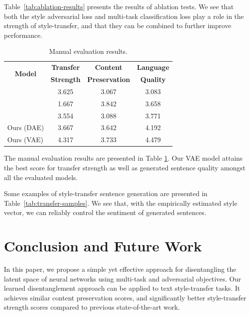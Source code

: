 \documentclass[letterpaper]{article} %
\newcommand{\tabh}[1]{\multicolumn{1}{c|}{\textbf{#1}}}
\newcommand{\tabc}[2]{\multicolumn{1}{|c||}{\multirow{#1}{*}{\textbf{#2}}}}
\begin{document}
Table~\ref{tab:ablation-results} presents the results of ablation tests.
We see that both the style adversarial loss and multi-task classification loss play a role in the strength of style-transfer, and that they can be combined to further improve performance.

\begin{table}[ht]
	\centering
	\begin{tabular}{| l || c | c | c | }
		\hline
		\tabc{2}{Model}                    & \tabh{Transfer} & \tabh{Content}      & \tabh{Language} \\
		                                   & \tabh{Strength} & \tabh{Preservation} & \tabh{Quality}  \\
		\hline
		\hline
		\citeauthor{shen2017style}         & 3.625           & 3.067               & 3.083           \\
		\hline
		\citeauthor{fu2017style}           & 1.667           & 3.842               & 3.658           \\
		\hline
		\citeauthor{zhao2018adversarially} & 3.554           & 3.088               & 3.771           \\
		\hline
		Ours (DAE)                         & 3.667           & 3.642               & 4.192           \\
		\hline
		Ours (VAE)                         & 4.317           & 3.733               & 4.479           \\
		\hline
	\end{tabular}
	\caption{Manual evaluation results.}
	\label{tab:manual-evaluation}
\end{table}

The manual evaluation results are presented in Table \ref{tab:manual-evaluation}.
Our VAE model attains the best score for transfer strength as well as generated sentence quality amongst all the evaluated models.

Some examples of style-transfer sentence generation are presented in Table~\ref{tab:transfer-samples}.
We see that, with the empirically estimated style vector, we can reliably control the sentiment of generated sentences.

\section{Conclusion and Future Work}
In this paper, we propose a simple yet effective approach for disentangling the latent space of neural networks using multi-task and adversarial objectives.
Our learned disentanglement approach can be applied to text style-transfer tasks.
It achieves similar content preservation scores, and significantly better style-transfer strength scores compared to previous state-of-the-art work.
\end{document}
